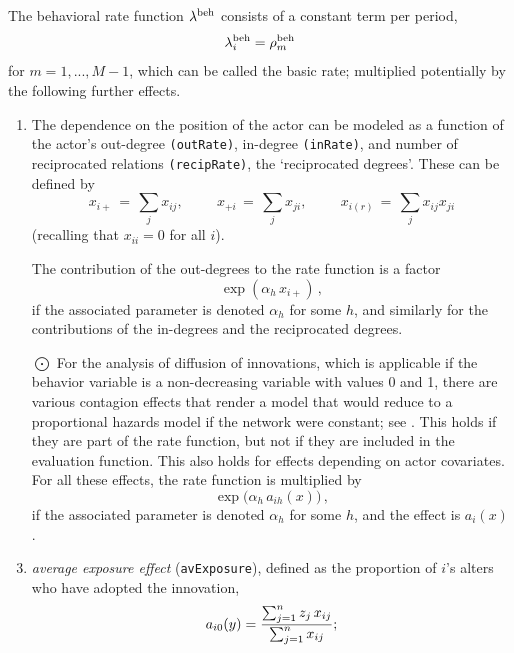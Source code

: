 \documentclass[a4paper,fleqn,11pt]{article}
\newcommand{\+}{\, + \,}
\newcommand{\vit}{\theenumi}
\begin{document}
The behavioral rate function $\lambda^{\rm beh}$ consists of a
constant term per period, \[ \lambda^{\rm beh}_{i} = \rho^{\rm
beh}_m \] for $m = 1, ..., M-1$, which can be called the basic rate;
multiplied potentially by the following further effects.
\begin{enumerate}
 \item The dependence on the position of the actor can be modeled
 as a function of the actor's out-degree \texttt{(outRate)},
 in-degree \texttt{(inRate)}, and number
 of reciprocated relations \texttt{(recipRate)}, the `reciprocated degrees'.
 These can be defined by
 \[ x_{i+} \,=\, \sum_j x_{ij}, \phantom{abcde} x_{+i} \,=\, \sum_j x_{ji},
                \phantom{abcde} x_{i(r)} \,=\, \sum_j x_{ij}x_{ji} \]
 (recalling that $x_{ii} = 0$ for all $i$).

The contribution of the out-degrees to the rate function
is a factor
 \[ \exp( \alpha_h \, x_{i+})\,, \]
if the associated parameter is denoted $\alpha_h$ for some $h$,
and similarly for the contributions of the in-degrees and the
reciprocated degrees.

 \item[{\hspace*{-1ex}$\bigodot$}]
 For the analysis of diffusion of innovations,
  which is applicable if the behavior variable
  is a non-decreasing variable with values 0 and 1,
  there are various contagion effects that render a model that
  would reduce to a proportional hazards model if the network
  were constant; see \citet{Greenan15}.
  This holds if they are part of the rate function,
  but not if they are included in the evaluation function.
  This also holds for effects depending on actor covariates.
  For all these effects, the rate function is multiplied by
 \[ \exp\big( \alpha_h \, a_{ih}(x)\big)\,, \]
 if the associated parameter is denoted $\alpha_h$ for some $h$,
 and the effect is $a_i(x)$.



\item \emph{average exposure effect} (\verb|avExposure|),
  defined as the proportion of $i$'s alters who have adopted the innovation,
\[
a_{i\vit}(y) = \frac{\sum_{j=1}^n z_j\, x_{ij} }{\sum_{j=1}^n x_{ij}};
\]


\end{enumerate}
\end{document}
